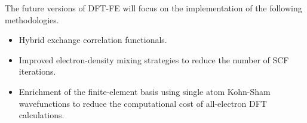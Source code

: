 The future versions of DFT-FE will focus on the implementation of the following methodologies.
\begin{itemize}
\item Hybrid exchange correlation functionals.	
\item Improved electron-density mixing strategies to reduce the number of SCF iterations.
\item Enrichment of the finite-element basis using single atom Kohn-Sham wavefunctions to reduce the computational cost of all-electron DFT calculations.
\end{itemize} 

